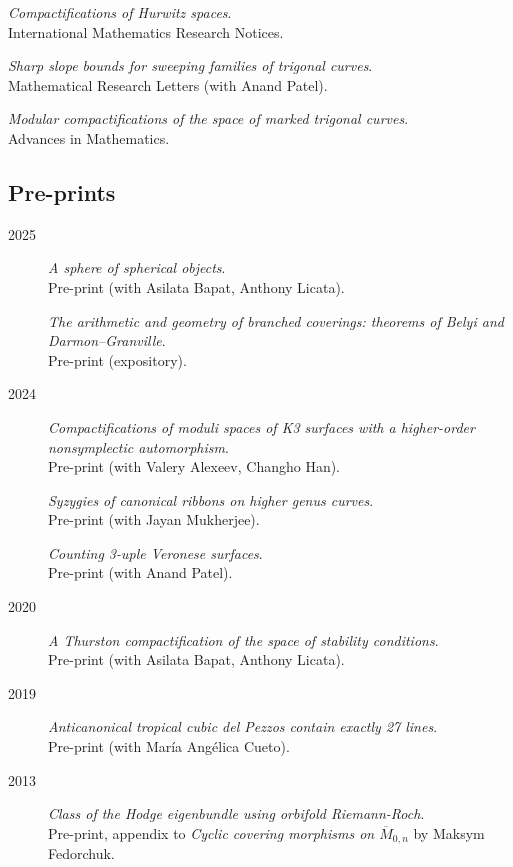 \documentclass[11pt]{article}
\begin{document}
\begin{description}
\emph{Compactifications of Hurwitz spaces}.\\
International Mathematics Research Notices.
\item[{2013}] \emph{Sharp slope bounds for sweeping families of trigonal curves}.\\
Mathematical Research Letters (with Anand Patel).

\emph{Modular compactifications of the space of marked trigonal curves}.\\
Advances in Mathematics.
\end{description}
\subsection*{Pre-prints}
\label{sec:org2683f25}
\label{org2ce9957}
\begin{description}
\item[{2025}] \emph{A sphere of spherical objects}.\\
Pre-print (with Asilata Bapat, Anthony Licata).

\emph{The arithmetic and geometry of branched coverings: theorems of Belyi and Darmon--Granville}.\\
Pre-print (expository).
\item[{2024}] \emph{Compactifications of moduli spaces of K3 surfaces with a higher-order nonsymplectic automorphism}.\\
Pre-print (with Valery Alexeev, Changho Han).

\emph{Syzygies of canonical ribbons on higher genus curves}.\\
Pre-print (with Jayan Mukherjee).

\emph{Counting 3-uple Veronese surfaces}.\\
Pre-print (with Anand Patel).
\item[{2020}] \emph{A Thurston compactification of the space of stability conditions}.\\
Pre-print (with Asilata Bapat, Anthony Licata).
\item[{2019}] \emph{Anticanonical tropical cubic del Pezzos contain exactly 27 lines}.\\
Pre-print (with María Angélica Cueto).
\item[{2013}] \emph{Class of the Hodge eigenbundle using orbifold Riemann-Roch}.\\
Pre-print, appendix to \emph{Cyclic covering morphisms on \(\overline M_{0,n}\)} by Maksym Fedorchuk.
\end{description}
\end{document}
